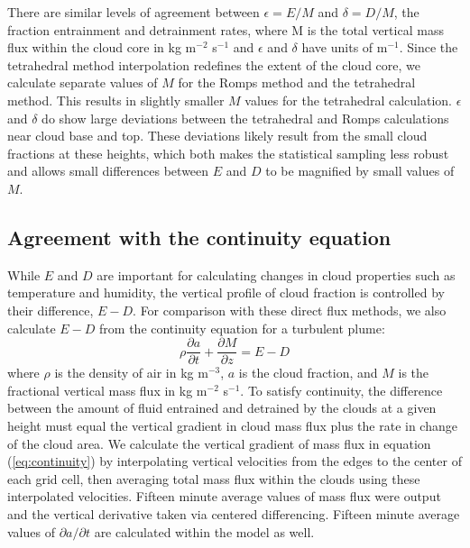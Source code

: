 \documentclass[12pt]{article}
\begin{document}
There are similar levels of agreement between $\epsilon = E/M$ and 
$\delta = D/M$, the fraction entrainment and detrainment rates, where M is the 
total vertical mass flux within the cloud core in kg m$^{-2}$ s$^{-1}$ and 
$\epsilon$ and $\delta$ have units of m$^{-1}$.  Since the tetrahedral method 
interpolation redefines the extent of the cloud core, we calculate separate 
values of $M$ for the Romps method and the tetrahedral method.  This results in 
slightly smaller $M$ values for the tetrahedral calculation.  $\epsilon$ and 
$\delta$ do show large deviations between the tetrahedral and Romps
calculations near cloud base and top.  These deviations likely result from the 
small cloud fractions at these heights, which both makes the statistical 
sampling less robust and allows small differences between $E$ and $D$ to be 
magnified by small values of $M$.  

\subsection{Agreement with the continuity equation}

While $E$ and $D$ are important for calculating changes in cloud properties 
such as temperature and humidity, the vertical profile of cloud fraction is
controlled by their difference, $E-D$.  For comparison with these direct 
flux methods, we also calculate $E-D$ from the continuity equation for a 
turbulent plume: 
\begin{equation}
    \label{eq:continuity}
    \rho \frac{\partial a}{\partial t} 
    + \frac{\partial M}{\partial z}
    = E - D
\end{equation}
where $\rho$ is the density of air in kg m$^{-3}$, $a$ is the cloud fraction, 
and $M$ is the fractional vertical mass flux in kg m$^{-2}$ s$^{-1}$.  To 
satisfy continuity, the difference between the amount of fluid entrained and 
detrained by the clouds at a given height must equal the vertical gradient in 
cloud mass flux plus the rate in change of the cloud area.  We calculate the 
vertical gradient of mass flux in equation (\ref{eq:continuity}) by 
interpolating vertical velocities from the edges to the center of each grid 
cell, then averaging total mass flux within the clouds using these interpolated 
velocities.  Fifteen minute average values of mass flux were output and the 
vertical derivative taken via centered differencing.  Fifteen minute average 
values of $\partial a/\partial t$ are calculated within the model as well.  
\end{document}
